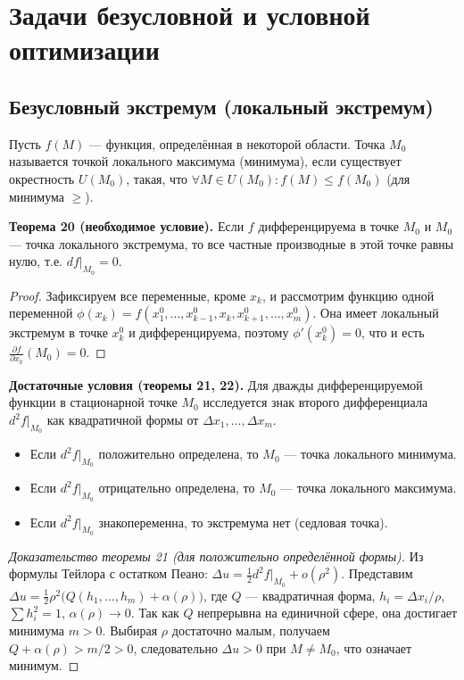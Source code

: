 \documentclass{article}
\theoremstyle{definition}
\begin{document}
\section{Задачи безусловной и условной оптимизации}

\subsection{Безусловный экстремум (локальный экстремум)}
Пусть $f(M)$ — функция, определённая в некоторой области. Точка $M_0$ называется точкой локального максимума (минимума), если существует окрестность $U(M_0)$, такая, что $\forall M\in U(M_0): f(M)\le f(M_0)$ (для минимума $\ge$).

\textbf{Теорема 20 (необходимое условие).} Если $f$ дифференцируема в точке $M_0$ и $M_0$ — точка локального экстремума, то все частные производные в этой точке равны нулю, т.е. $df|_{M_0}=0$.
\begin{proof}
Зафиксируем все переменные, кроме $x_k$, и рассмотрим функцию одной переменной $\phi(x_k)=f(x_1^0,\dots,x_{k-1}^0,x_k,x_{k+1}^0,\dots,x_m^0)$. Она имеет локальный экстремум в точке $x_k^0$ и дифференцируема, поэтому $\phi'(x_k^0)=0$, что и есть $\frac{\partial f}{\partial x_k}(M_0)=0$.
\end{proof}

\textbf{Достаточные условия (теоремы 21, 22).} Для дважды дифференцируемой функции в стационарной точке $M_0$ исследуется знак второго дифференциала $d^2f|_{M_0}$ как квадратичной формы от $\Delta x_1,\dots,\Delta x_m$.
\begin{itemize}
    \item Если $d^2f|_{M_0}$ положительно определена, то $M_0$ — точка локального минимума.
    \item Если $d^2f|_{M_0}$ отрицательно определена, то $M_0$ — точка локального максимума.
    \item Если $d^2f|_{M_0}$ знакопеременна, то экстремума нет (седловая точка).
\end{itemize}

\begin{proof}[Доказательство теоремы 21 (для положительно определённой формы)]
Из формулы Тейлора с остатком Пеано: $\Delta u = \frac12 d^2f|_{M_0} + o(\rho^2)$. Представим $\Delta u = \frac12 \rho^2\bigl(Q(h_1,\dots,h_m)+\alpha(\rho)\bigr)$, где $Q$ — квадратичная форма, $h_i=\Delta x_i/\rho$, $\sum h_i^2=1$, $\alpha(\rho)\to0$. Так как $Q$ непрерывна на единичной сфере, она достигает минимума $m>0$. Выбирая $\rho$ достаточно малым, получаем $Q+\alpha(\rho) > m/2 >0$, следовательно $\Delta u>0$ при $M\neq M_0$, что означает минимум.
\end{proof}
\end{document}

